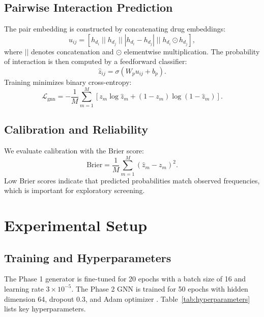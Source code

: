 \documentclass[conference]{IEEEtran}
\begin{document}
\subsection{Pairwise Interaction Prediction}
The pair embedding is constructed by concatenating drug embeddings:
\begin{equation}
    u_{ij} = [h_{d_i} \; || \; h_{d_j} \; || \; |h_{d_i} - h_{d_j}| \; || \; h_{d_i} \odot h_{d_j}],
\end{equation}
where $||$ denotes concatenation and $\odot$ elementwise multiplication. The probability of interaction is then computed by a feedforward classifier:
\begin{equation}
    \hat{z}_{ij} = \sigma(W_p u_{ij} + b_p).
\end{equation}
Training minimizes binary cross-entropy:
\begin{equation}
    \mathcal{L}_{\text{gnn}} = -\frac{1}{M} \sum_{m=1}^{M} \left[ z_m \log \hat{z}_m + (1-z_m) \log(1-\hat{z}_m) \right].
\end{equation}

\subsection{Calibration and Reliability}
We evaluate calibration with the Brier score:
\begin{equation}
    \mathrm{Brier} = \frac{1}{M} \sum_{m=1}^{M} (\hat{z}_m - z_m)^2.
\end{equation}
Low Brier scores indicate that predicted probabilities match observed frequencies, which is important for exploratory screening.

\section{Experimental Setup}
\subsection{Training and Hyperparameters}
The Phase 1 generator is fine-tuned for 20 epochs with a batch size of 16 and learning rate $3\times 10^{-5}$. The Phase 2 GNN is trained for 50 epochs with hidden dimension 64, dropout 0.3, and Adam optimizer \cite{kingma2014adam}. Table~\ref{tab:hyperparameters} lists key hyperparameters.
\end{document}

